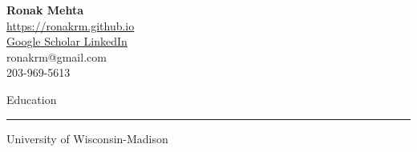 \documentclass[]{article}
\title{}
\author{}
\date{}
\begin{document}
\begin{center}
	{\Huge\bf Ronak Mehta} \\
	\vspace{5pt}
	\url{https://ronakrm.github.io} \\
	\href{https://scholar.google.com/citations?user=zFRqln4AAAAJ&hl=en}{ Google Scholar}\quad \href{https://www.linkedin.com/in/ronak-mehta-64627491/}{ LinkedIn} \\
	ronakrm@gmail.com \\
	203-969-5613 \\
\end{center}



\vspace{5pt}
{\LARGE Education}
\vspace{3pt}
\hrule
\vspace{10pt}


University of Wisconsin-Madison
	 
\end{document}
